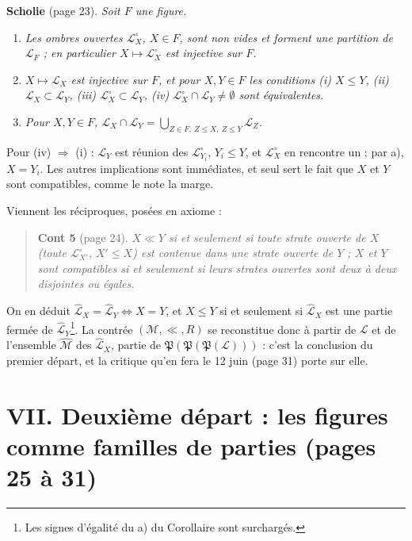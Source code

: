 \documentclass[11pt,a4paper]{article}
\begin{document}
\textbf{Scholie} (page 23). \emph{Soit $F$ une figure.}
\begin{enumerate}
\item[a)] \emph{Les ombres ouvertes $\mathcal{L}^{\circ}_{X}$, $X \in F$, sont
non vides et forment une partition de $\mathcal{L}_{F}$ ; en particulier
$X \mapsto \mathcal{L}^{\circ}_{X}$ est injective sur $F$.}
\item[b)] \emph{$X \mapsto \mathcal{L}_{X}$ est injective sur $F$, et pour
$X, Y \in F$ les conditions (i) $X \leq Y$, (ii) $\mathcal{L}_{X} \subset
\mathcal{L}_{Y}$, (iii) $\mathcal{L}^{\circ}_{X} \subset \mathcal{L}_{Y}$,
(iv) $\mathcal{L}^{\circ}_{X} \cap \mathcal{L}_{Y} \neq \emptyset$ sont
équivalentes.}
\item[c)] \emph{Pour $X, Y \in F$, $\mathcal{L}_{X} \cap \mathcal{L}_{Y} =
\bigcup_{Z \in F,\ Z \leq X,\ Z \leq Y} \mathcal{L}_{Z}$.}
\end{enumerate}

Pour (iv) $\Rightarrow$ (i) : $\mathcal{L}_{Y}$ est réunion des
$\mathcal{L}^{\circ}_{Y_{i}}$, $Y_{i} \leq Y$, et $\mathcal{L}^{\circ}_{X}$ en
rencontre un ; par a), $X = Y_{i}$. Les autres implications sont immédiates, et
seul sert le fait que $X$ et $Y$ sont compatibles, comme le note la marge.

Viennent les réciproques, posées en axiome :

\begin{quote}
\textbf{Cont 5} (page 24). \emph{$X \ll Y$ si et seulement si toute strate
ouverte de $X$ (toute $\mathcal{L}^{\circ}_{X'}$, $X' \leq X$) est
contenue dans une strate ouverte de $Y$ ; $X$ et $Y$ sont compatibles si et
seulement si leurs strates ouvertes sont deux à deux disjointes ou égales.}
\end{quote}

On en déduit $\widehat{\mathcal{L}}_{X} = \widehat{\mathcal{L}}_{Y} \iff X = Y$,
et $X \leq Y$ si et seulement si $\widehat{\mathcal{L}}_{X}$ est une partie
fermée de $\widehat{\mathcal{L}}_{Y}$\footnote{Les signes d'égalité du a) du
Corollaire sont surchargés.}. La contrée $(\mathcal{M}, \ll, R)$ se reconstitue
donc à partir de $\mathcal{L}$ et de l'ensemble $\widehat{\mathcal{M}}$ des
$\widehat{\mathcal{L}}_{X}$, partie de
$\mathfrak{P}(\mathfrak{P}(\mathfrak{P}(\mathcal{L})))$ : c'est la conclusion du
premier départ, et la critique qu'en fera le 12 juin (page 31) porte
sur elle.


\section*{VII. Deuxième départ : les figures comme familles de parties (pages 25 à 31)}
\end{document}
